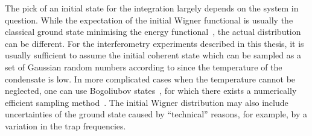 The pick of an initial state for the integration largely depends on the system in question.
While the expectation of the initial Wigner functional is usually the classical ground state minimising the energy functional~, the actual distribution can be different.
For the interferometry experiments described in this thesis, it is usually sufficient to assume the initial coherent state which can be sampled as a set of Gaussian random numbers according to  since the temperature of the condensate is low.
In more complicated cases when the temperature cannot be neglected, one can use Bogoliubov states~\cite{Blakie2008,Ruostekoski2010}, for which there exists a numerically efficient sampling method~\cite{Sinatra2002}.
The initial Wigner distribution may also include uncertainties of the ground state caused by ``technical'' reasons, for example, by a variation in the trap frequencies.

